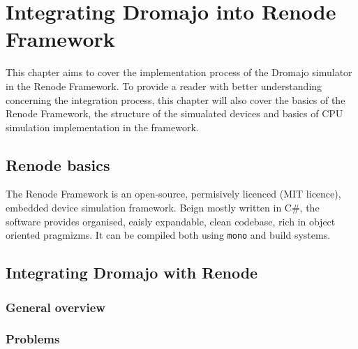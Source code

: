 
\chapter{Integrating Dromajo into Renode Framework}

This chapter aims to cover the implementation process of the Dromajo simulator in the Renode Framework.
To provide a reader with better understanding concerning the integration process, this chapter will also cover
the basics of the Renode Framework, the structure of the simualated devices and basics of CPU simulation
implementation in the framework.

\section{Renode basics}

The Renode Framework is an open-source, permisively licenced (MIT licence), embedded device simulation framework.
Beign mostly written in C\#, the software provides organised, eaisly expandable, clean codebase, rich in object
oriented pragmizms. It can be compiled both using \texttt{mono} and  build systems.

\section{Integrating Dromajo with Renode}

\subsection{General overview}

\subsection{Problems}